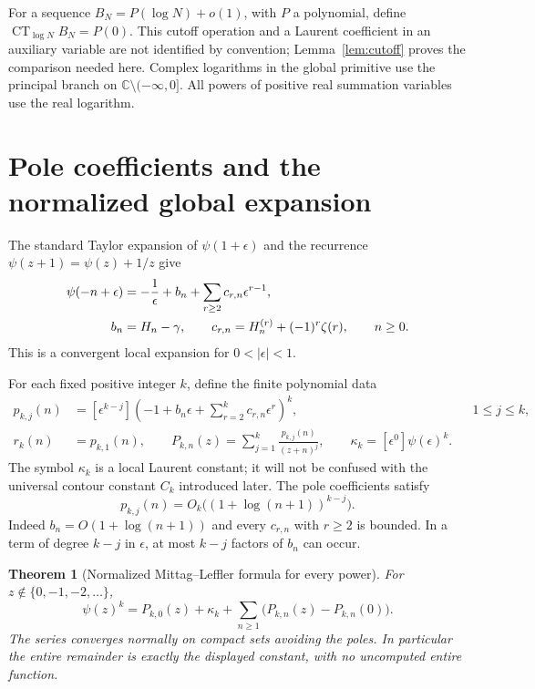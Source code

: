 \documentclass[11pt,a4paper]{article}
\numberwithin{equation}{section}
\newtheorem{theorem}{Theorem}[section]
\theoremstyle{definition}
\theoremstyle{remark}
\DeclareMathOperator{\CT}{CT}
\newcommand{\C}{\mathbb C}
\begin{document}
For a sequence $B_N=P(\log N)+o(1)$, with $P$ a polynomial, define
$\CT_{\log N}B_N=P(0)$.  This cutoff operation and a Laurent
coefficient in an auxiliary variable are not identified by convention;
Lemma~\ref{lem:cutoff} proves the comparison needed here.  Complex
logarithms in the global primitive use the principal branch on
$\C\setminus(-\infty,0]$.  All powers of positive real summation
variables use the real logarithm.

\section{Pole coefficients and the normalized global expansion}
\label{sec:poles}

The standard Taylor expansion of $\psi(1+\epsilon)$ and the recurrence
$\psi(z+1)=\psi(z)+1/z$ give \cite[\S\S5.5,5.7]{DLMF}
\begin{align}
 \psi(-n+\epsilon)
 &=-\frac1\epsilon+b_n+
                 \sum_{r\ge2}c_{r,n}\epsilon^{r-1},
 \label{eq:pole-series}\\
 b_n&=H_n-\gamma,\qquad
 c_{r,n}=H_n^{(r)}+(-1)^r\zeta(r),\qquad n\ge0.
 \notag
\end{align}
This is a convergent local expansion for $0<|\epsilon|<1$.

For each fixed positive integer $k$, define the finite polynomial data
\begin{align}
 p_{k,j}(n)
 &=[\epsilon^{k-j}]
   \left(-1+b_n\epsilon+\sum_{r=2}^k c_{r,n}\epsilon^r\right)^k,
      &&1\le j\le k, \label{eq:pdef}\\
 r_k(n)&=p_{k,1}(n),\qquad
 P_{k,n}(z)=\sum_{j=1}^k\frac{p_{k,j}(n)}{(z+n)^j},
 \qquad
 \kappa_k=[\epsilon^0]\psi(\epsilon)^k.
 \label{eq:Pdef}
\end{align}
The symbol $\kappa_k$ is a local Laurent constant; it will not be
confused with the universal contour constant $C_k$ introduced later.
The pole coefficients satisfy
\begin{equation}
 p_{k,j}(n)=O_k\bigl((1+\log(n+1))^{k-j}\bigr).
 \label{eq:p-growth}
\end{equation}
Indeed $b_n=O(1+\log(n+1))$ and every $c_{r,n}$ with $r\ge2$ is
bounded.  In a term of degree $k-j$ in $\epsilon$, at most $k-j$
factors of $b_n$ can occur.

\begin{theorem}[Normalized Mittag--Leffler formula for every power]
\label{thm:ML}
For $z\notin\{0,-1,-2,\ldots\}$,
\begin{equation}
 \boxed{\;
 \psi(z)^k=P_{k,0}(z)+\kappa_k+
       \sum_{n\ge1}\bigl(P_{k,n}(z)-P_{k,n}(0)\bigr).
 \;}
 \label{eq:ML}
\end{equation}
The series converges normally on compact sets avoiding the poles.
In particular the entire remainder is exactly the displayed constant,
with no uncomputed entire function.
\end{theorem}
\end{document}
